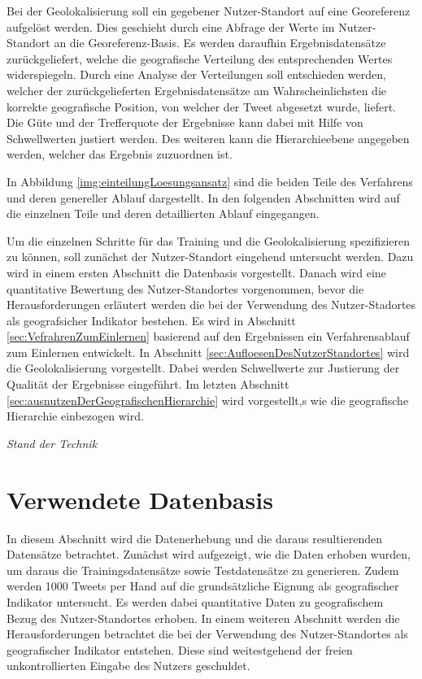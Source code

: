 		Bei der Geolokalisierung soll ein gegebener Nutzer-Standort auf eine Georeferenz aufgelöst werden. 
		Dies geschieht durch eine Abfrage der Werte im Nutzer-Standort an die Georeferenz-Basis.
		Es werden daraufhin Ergebnisdatensätze zurückgeliefert, welche die geografische Verteilung des entsprechenden Wertes widerspiegeln.
		Durch eine Analyse der Verteilungen soll entschieden werden, welcher der zurückgelieferten Ergebnisdatensätze am Wahrscheinlichsten die korrekte geografische Position, von welcher der Tweet abgesetzt wurde, liefert.
		Die Güte und der Trefferquote der Ergebnisse kann dabei mit Hilfe von Schwellwerten justiert werden.
		Des weiteren kann die Hierarchieebene angegeben werden, welcher das Ergebnis zuzuordnen ist.

		In Abbildung \ref{img:einteilungLoesungsansatz} sind die beiden Teile des Verfahrens und deren genereller Ablauf dargestellt.
		In den folgenden Abschnitten wird auf die einzelnen Teile und deren detaillierten Ablauf eingegangen. 
		
		Um die einzelnen Schritte für das Training und die Geolokalisierung spezifizieren zu können, soll zunächst der Nutzer-Standort eingehend untersucht werden.
		Dazu wird in einem ersten Abschnitt die Datenbasis vorgestellt.
		Danach wird eine quantitative Bewertung des Nutzer-Standortes vorgenommen, bevor die Herausforderungen erläutert werden die bei der Verwendung des Nutzer-Stadortes als geografsicher Indikator bestehen.
		Es wird in Abschnitt \ref{sec:VefrahrenZumEinlernen} basierend auf den Ergebnissen ein Verfahrensablauf zum Einlernen entwickelt. 
		In Abschnitt \ref{sec:AufloesenDesNutzerStandortes} wird die Geolokalisierung vorgestellt.
		Dabei werden Schwellwerte zur Justierung der Qualität der Ergebnisse eingeführt.
		Im letzten Abschnitt \ref{sec:ausnutzenDerGeografischenHierarchie} wird vorgestellt,s wie die geografische Hierarchie einbezogen wird.

		\textit{Stand der Technik} 

	\section{Verwendete Datenbasis}

		In diesem Abschnitt wird die Datenerhebung und die daraus resultierenden Datensätze betrachtet.
		Zunächst wird aufgezeigt, wie die Daten erhoben wurden, um daraus die Trainingsdatensätze sowie Testdatensätze zu generieren.
		Zudem werden 1000 Tweets per Hand auf die grundsätzliche Eignung als geografischer Indikator untersucht.
		Es werden dabei quantitative Daten zu geografischem Bezug des Nutzer-Standortes erhoben.
		In einem weiteren Abschnitt werden die Herausforderungen betrachtet die bei der Verwendung des Nutzer-Standortes als geografischer Indikator entstehen. 
		Diese sind weitestgehend der freien unkontrollierten Eingabe des Nutzers geschuldet.

